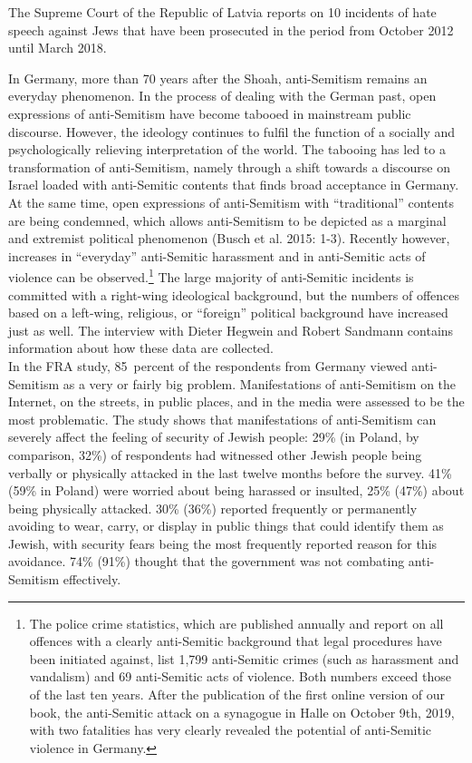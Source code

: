 The Supreme Court of the Republic of Latvia reports on 10 incidents of hate speech against Jews that have been prosecuted in the period from October 2012 until March 2018. \par
In Germany, more than 70 years after the Shoah, anti-Semitism remains an everyday phenomenon. In the process of dealing with the German past, open expressions of anti-Semitism have become tabooed in mainstream public discourse. However, the ideology continues to fulfil the function of a socially and psychologically relieving interpretation of the world. The tabooing has led to a transformation of anti-Semitism, namely through a shift towards a discourse on Israel loaded with anti-Semitic contents that finds broad acceptance in Germany. At the same time, open expressions of anti-Semitism with ``traditional'' contents are being condemned, which allows anti-Semitism to be depicted as a marginal and extremist political phenomenon (Busch et al. 2015: 1-3). Recently however, increases in ``everyday'' anti-Semitic harassment and in anti-Semitic acts of violence can be observed.\footnote{The police crime statistics, which are published annually and report on all offences with a clearly anti-Semitic background that legal procedures have been initiated against, list 1,799 anti-Semitic crimes (such as harassment and vandalism) and 69 anti-Semitic acts of violence. Both numbers exceed those of the last ten years. After the publication of the first online version of our book, the anti-Semitic attack on a synagogue in Halle on October 9th, 2019, with two fatalities has very clearly revealed the potential of anti-Semitic violence in Germany.} The large majority of anti-Semitic incidents is committed with a right-wing ideological background, but the numbers of offences based on a left-wing, religious, or ``foreign'' political background have increased just as well. The interview with Dieter Hegwein and Robert Sandmann contains information about how these data are collected.\\
In the FRA study, 85\ percent of the respondents from Germany viewed anti-Semitism as a very or fairly big problem. Manifestations of anti-Semitism on the Internet, on the streets, in public places, and in the media were assessed to be the most problematic. The study shows that manifestations of anti-Semitism can severely affect the feeling of security of Jewish people: 29\% (in Poland, by comparison, 32\%) of respondents had witnessed other Jewish people being verbally or physically attacked in the last twelve months before the survey. 41\% (59\% in Poland) were worried about being harassed or insulted, 25\% (47\%) about being physically attacked. 30\% (36\%) reported frequently or permanently avoiding to wear, carry, or display in public things that could identify them as Jewish, with security fears being the most frequently reported reason for this avoidance. 74\% (91\%) thought that the government was not combating anti-Semitism effectively.\\  
